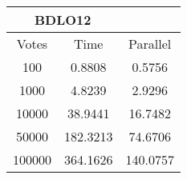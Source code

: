 \documentclass{standalone}
\begin{document}
\begin{tabular}{| c | c | c |}
    \hline
    \multicolumn{2}{|c|}{BDLO12}\\      %
    \hline                              %
    Votes & Time & Parallel\\ \hline    %
    100 & 0.8808 & 0.5756\\ \hline
    1000 & 4.8239 & 2.9296\\ \hline
    10000 & 38.9441 & 16.7482\\ \hline
    50000 & 182.3213 & 74.6706\\ \hline
    100000 & 364.1626 & 140.0757\\      %
    \hline
\end{tabular}
\end{document}
